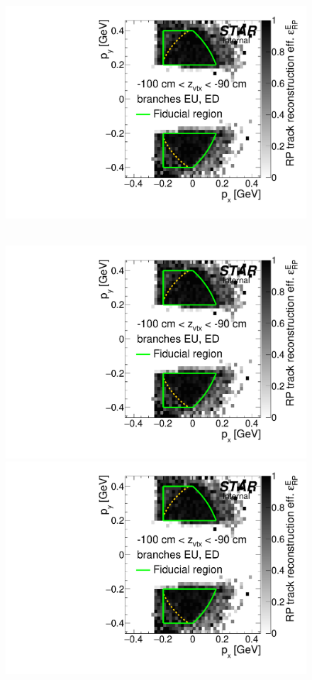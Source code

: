 \begin{figure}[hb]
{  \includegraphics[width=\linewidth,page=27]{graphics/corrections/mcFullEffPxPy.pdf}
}~
\parbox{0.495\textwidth}{
  \centering
  \includegraphics[width=\linewidth,page=24]{graphics/corrections/mcFullEffPxPy.pdf}\\
  \includegraphics[width=\linewidth,page=26]{graphics/corrections/mcFullEffPxPy.pdf}\\
}
\end{figure}
